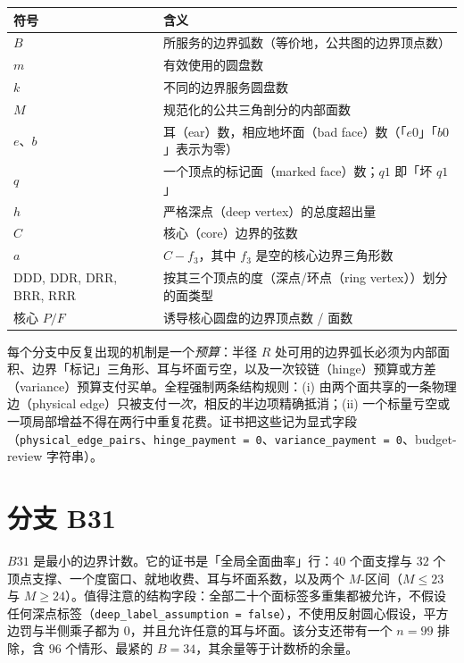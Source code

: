 \begin{center}
\footnotesize
\begin{tabular}{@{}lp{}@{}}
\toprule
符号 & 含义 \\
\midrule
$B$ & 所服务的边界弧数（等价地，公共图的边界顶点数） \\
$m$ & 有效使用的圆盘数 \\
$k$ & 不同的边界服务圆盘数 \\
$M$ & 规范化的公共三角剖分的内部面数 \\
$e$、$b$ & 耳（ear）数，相应地坏面（bad face）数（「$e0$」「$b0$」表示为零） \\
$q$ & 一个顶点的标记面（marked face）数；$q1$ 即「坏 $q1$」 \\
$h$ & 严格深点（deep vertex）的总度超出量 \\
$C$ & 核心（core）边界的弦数 \\
$a$ & $C-f_3$，其中 $f_3$ 是空的核心边界三角形数 \\
DDD, DDR, DRR, BRR, RRR & 按其三个顶点的度（深点/环点（ring vertex））划分的面类型 \\
核心 $P/F$ & 诱导核心圆盘的边界顶点数 / 面数 \\
\bottomrule
\end{tabular}
\end{center}

每个分支中反复出现的机制是一个\emph{预算}：半径 $R$ 处可用的边界弧长必须为内部面积、边界「标记」三角形、耳与坏面亏空，以及一次铰链（hinge）预算或方差（variance）预算支付买单。全程强制两条结构规则：(i) 由两个面共享的一条物理边（physical edge）只被支付\emph{一次}，相反的半边项精确抵消；(ii) 一个标量亏空或一项局部增益不得在两行中重复花费。证书把这些记为显式字段（\texttt{physical\_\allowbreak{}edge\_\allowbreak{}pairs}、\texttt{hinge\_\allowbreak{}payment = 0}、\texttt{variance\_\allowbreak{}payment = 0}、budget-review 字符串）。

\section{分支 B31}

$B31$ 是最小的边界计数。它的证书是「全局全面曲率」行：$40$ 个面支撑与 $32$ 个顶点支撑、一个度窗口、就地收费、耳与坏面系数，以及两个 $M$-区间（$M\le23$ 与 $M\ge24$）。值得注意的结构字段：全部二十个面标签多重集都被允许，不假设任何深点标签（\texttt{deep\_\allowbreak{}label\_\allowbreak{}assumption = false}），不使用反射圆心假设，平方边罚与半侧乘子都为 $0$，并且允许任意的耳与坏面。该分支还带有一个 $n=99$ 排除，含 $96$ 个情形、最紧的 $B=34$，其余量等于计数桥的余量。

